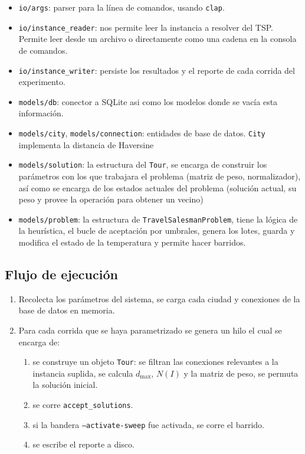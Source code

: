 \documentclass[11pt,letterpaper]{article}
\begin{document}
\begin{itemize}
  \item \texttt{io/args}: parser para la línea de comandos, usando \texttt{clap}.
  \item \texttt{io/instance\_reader}: nos permite leer la instancia a resolver del TSP. Permite leer desde un archivo o directamente como una cadena en la consola de comandos.
  \item \texttt{io/instance\_writer}: persiste los resultados y el reporte de cada corrida del experimento.
  \item \texttt{models/db}: conector a SQLite asi como los modelos donde se vacía esta información.
  \item \texttt{models/city}, \texttt{models/connection}: entidades de base de datos.
        \texttt{City} implementa la distancia de Haversine
  \item \texttt{models/solution}: la estructura del \texttt{Tour}, se encarga de construir los parámetros con los que trabajara el problema (matriz de peso, normalizador), así como se encarga de los estados actuales del problema (solución actual, su peso y provee la operación para obtener un vecino)
  \item \texttt{models/problem}: la estructura de \texttt{TravelSalesmanProblem}, tiene la lógica de la heurística, el bucle de aceptación por umbrales, genera los lotes, guarda y modifica el estado de la temperatura y permite hacer barridos.
\end{itemize}

\subsection{Flujo de ejecución}

\begin{enumerate}
  \item Recolecta los parámetros del sistema, se carga cada ciudad y conexiones de la base de datos en memoria.
  \item Para cada corrida que se haya parametrizado se genera un hilo el cual se encarga de:
    \begin{enumerate}
      \item se construye un objeto \texttt{Tour}: se filtran las conexiones relevantes a la instancia suplida,
            se calcula $d_{\max}$, $N(I)$ y la matriz de peso, se permuta la solución inicial.
      \item se corre \texttt{accept\_solutions}.
      \item si la bandera \texttt{--activate-sweep} fue activada, se corre el barrido.
      \item se escribe el reporte a disco.
    \end{enumerate}
\end{enumerate}
\end{document}
